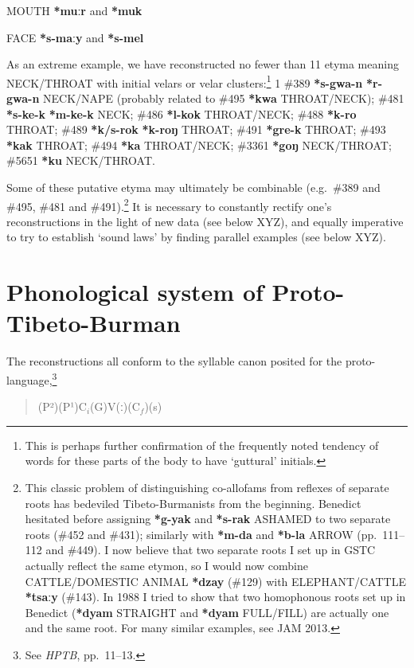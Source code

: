 MOUTH \textbf{*muːr} and \textbf{*muk}

FACE \textbf{*s-maːy} and \textbf{*s-mel}

As an extreme example, we have reconstructed no fewer than 11 etyma meaning NECK/THROAT with initial velars or velar clusters:\footnote{This is perhaps further confirmation of the frequently noted tendency of words for these parts of the body to have ‘guttural’ initials.} 1 \#389 \textbf{*s-gwa-n}  \textbf{*r-gwa-n} NECK/NAPE (probably related to \#495 \textbf{*kwa} THROAT/NECK); \#481 \textbf{*s-ke-k}  \textbf{*m-ke-k} NECK; \#486 \textbf{*l-kok} THROAT/NECK; \#488 \textbf{*k-ro} THROAT; \#489 \textbf{*k/s-rok}  \textbf{*k-roŋ} THROAT; \#491 \textbf{*gre-k} THROAT; \#493 \textbf{*kak} THROAT; \#494 \textbf{*ka} THROAT/NECK; \#3361 \textbf{*goŋ} NECK/THROAT; \#5651 \textbf{*ku} NECK/THROAT.

Some of these putative etyma may ultimately be combinable (e.g.\ \#389 and \#495, \#481 and \#491).\footnote{This classic problem of distinguishing co-allofams from reflexes of separate roots has bedeviled Tibeto-Burmanists from the beginning. Benedict \citep{STC} hesitated before assigning \textbf{*g-yak} and \textbf{*s-rak} ASHAMED to two separate roots (\#452 and \#431); similarly with \textbf{*m-da} and \textbf{*b-la} ARROW (pp.~111–112 and \#449). I now believe that two separate roots I set up in GSTC \citep{JAM-GSTC} actually reflect the same etymon, so I would now combine CATTLE/DOMESTIC ANIMAL \textbf{*dzay} (\#129) with ELEPHANT/CATTLE \textbf{*tsaːy} (\#143). In 1988 I tried to show that two homophonous roots set up in Benedict \citep{STC} (\textbf{*dyam} STRAIGHT and \textbf{*dyam} FULL/FILL) are actually one and the same root. For many similar examples, see JAM 2013.} It is necessary to constantly rectify one’s reconstructions in the light of new data (see below XYZ), and equally imperative to try to establish ‘sound laws’ by finding parallel examples (see below XYZ).

\section{Phonological system of Proto-Tibeto-Burman}


The reconstructions all conform to the syllable canon posited for the
proto-language,\footnote{See \textit{HPTB}, pp.~11–13.}

\begin{quote}
(P²)\hspace{2em}(P¹)\hspace{2em}$\textrm{C}_i$\hspace{2em}(G)\hspace{2em}V\hspace{2em}(ː)\hspace{2em}($\textrm{C}_f$)\hspace{2em}(s)
\end{quote}
	

